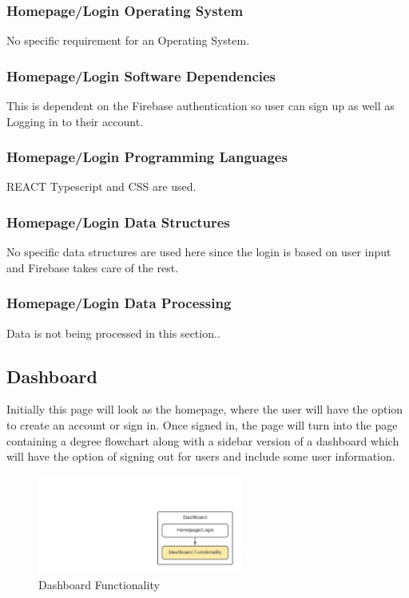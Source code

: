 \subsubsection{Homepage/Login Operating System}
No specific requirement for an Operating System.

\subsubsection{Homepage/Login Software Dependencies}
This is dependent on the Firebase authentication so user can sign up as well as Logging in to their account.

\subsubsection{Homepage/Login Programming Languages}
REACT Typescript and CSS are used.

\subsubsection{Homepage/Login Data Structures}
No specific data structures are used here since the login is based on user input and Firebase takes care of the rest.

\subsubsection{Homepage/Login Data Processing}
Data is not being processed in this section..

\subsection{Dashboard}
Initially this page will look as the homepage, where the user will have the option to create an account or sign in. Once signed in, the page will turn into the page containing a degree flowchart along with a sidebar version of a dashboard which will have the option of signing out for users and include some user information.

\begin{figure}[h!]
	\centering
 	\includegraphics[width=0.60\textwidth]{images/Dashboard_Pic2} %
 \caption{Dashboard Functionality} %
\end{figure}

